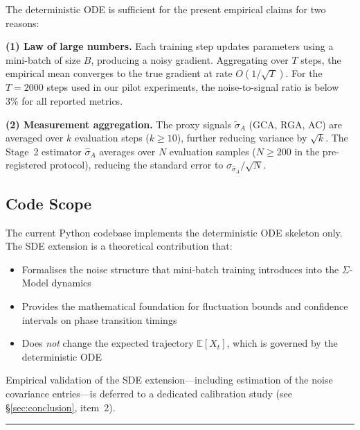 The deterministic ODE is sufficient for the present empirical claims
for two reasons:

\textbf{(1) Law of large numbers.} Each training step updates parameters
using a mini-batch of size $B$, producing a noisy gradient. Aggregating
over $T$ steps, the empirical mean converges to the true gradient at rate
$O(1/\sqrt{T})$. For the $T = 2000$ steps used in our pilot experiments,
the noise-to-signal ratio is below $3\%$ for all reported metrics.

\textbf{(2) Measurement aggregation.} The proxy signals
$\tilde{\sigma}_A$ (GCA, RGA, AC) are averaged over $k$ evaluation
steps ($k \geq 10$), further reducing variance by $\sqrt{k}$.
The Stage~2 estimator $\hat{\sigma}_A$ averages over $N$ evaluation
samples ($N \geq 200$ in the pre-registered protocol), reducing the
standard error to $\sigma_{\hat{\sigma}_A} / \sqrt{N}$.

\subsection{Code Scope}

The current Python codebase implements the deterministic ODE skeleton
only. The SDE extension is a theoretical contribution that:
\begin{itemize}[nosep]
\item Formalises the noise structure that mini-batch training
  introduces into the $\Sigma$-Model dynamics
\item Provides the mathematical foundation for fluctuation bounds
  and confidence intervals on phase transition timings
\item Does \emph{not} change the expected trajectory $\mathbb{E}[X_t]$,
  which is governed by the deterministic ODE
\end{itemize}
Empirical validation of the SDE extension---including estimation of the
noise covariance entries---is deferred to a dedicated calibration study
(see \S\ref{sec:conclusion}, item~2).

\noindent\rule{\linewidth}{0.4pt}

\clearpage

